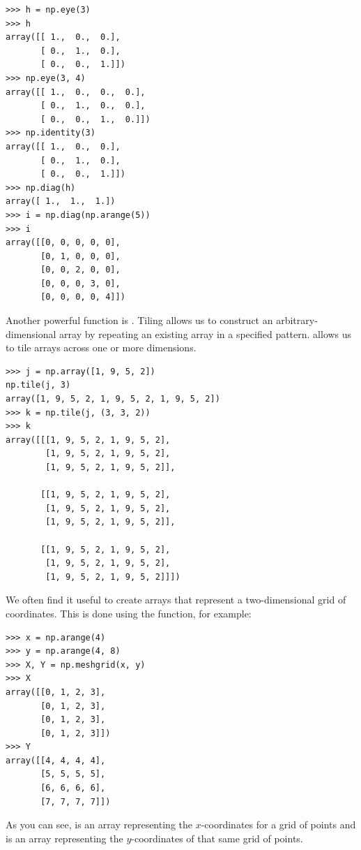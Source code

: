\begin{lstlisting}
>>> h = np.eye(3) 
>>> h
array([[ 1.,  0.,  0.],
       [ 0.,  1.,  0.],
       [ 0.,  0.,  1.]])
>>> np.eye(3, 4)
array([[ 1.,  0.,  0.,  0.],
       [ 0.,  1.,  0.,  0.],
       [ 0.,  0.,  1.,  0.]])
>>> np.identity(3)
array([[ 1.,  0.,  0.],
       [ 0.,  1.,  0.],
       [ 0.,  0.,  1.]])
>>> np.diag(h)
array([ 1.,  1.,  1.])
>>> i = np.diag(np.arange(5))
>>> i
array([[0, 0, 0, 0, 0],
       [0, 1, 0, 0, 0],
       [0, 0, 2, 0, 0],
       [0, 0, 0, 3, 0],
       [0, 0, 0, 0, 4]])
\end{lstlisting} 

Another powerful function is
. Tiling allows us to construct an arbitrary-dimensional array by repeating an existing array
 in a specified pattern.  allows us to tile arrays across one or more dimensions. 
\begin{lstlisting}
>>> j = np.array([1, 9, 5, 2]) 
np.tile(j, 3)
array([1, 9, 5, 2, 1, 9, 5, 2, 1, 9, 5, 2])
>>> k = np.tile(j, (3, 3, 2)) 
>>> k
array([[[1, 9, 5, 2, 1, 9, 5, 2],
        [1, 9, 5, 2, 1, 9, 5, 2],
        [1, 9, 5, 2, 1, 9, 5, 2]],

       [[1, 9, 5, 2, 1, 9, 5, 2],
        [1, 9, 5, 2, 1, 9, 5, 2],
        [1, 9, 5, 2, 1, 9, 5, 2]],

       [[1, 9, 5, 2, 1, 9, 5, 2],
        [1, 9, 5, 2, 1, 9, 5, 2],
        [1, 9, 5, 2, 1, 9, 5, 2]]])

\end{lstlisting}


We often find it useful to create arrays that represent a
two-dimensional grid of coordinates. This is done using the
 function, for example:
\begin{lstlisting}
>>> x = np.arange(4) 
>>> y = np.arange(4, 8) 
>>> X, Y = np.meshgrid(x, y) 
>>> X
array([[0, 1, 2, 3],
       [0, 1, 2, 3],
       [0, 1, 2, 3],
       [0, 1, 2, 3]])
>>> Y
array([[4, 4, 4, 4],
       [5, 5, 5, 5],
       [6, 6, 6, 6],
       [7, 7, 7, 7]])
\end{lstlisting} 
As you can see,  is an array representing the $x$-coordinates for a grid of points and  is an array representing the
$y$-coordinates of that same grid of points. 

